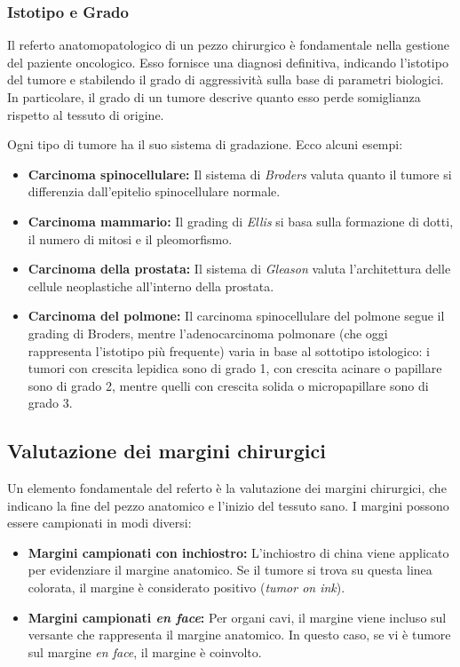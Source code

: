 \subsubsection{Istotipo e Grado}
Il referto anatomopatologico di un pezzo chirurgico è fondamentale nella gestione del paziente oncologico. Esso fornisce una diagnosi definitiva, indicando l’istotipo del tumore e stabilendo il grado di aggressività sulla base di parametri biologici. In particolare, il grado di un tumore descrive quanto esso perde somiglianza rispetto al tessuto di origine.

Ogni tipo di tumore ha il suo sistema di gradazione. Ecco alcuni esempi:
\begin{itemize}
    \item \textbf{Carcinoma spinocellulare:} Il sistema di \textit{Broders} valuta quanto il tumore si differenzia dall'epitelio spinocellulare normale.
    \item \textbf{Carcinoma mammario:} Il grading di \textit{Ellis} si basa sulla formazione di dotti, il numero di mitosi e il pleomorfismo.
    \item \textbf{Carcinoma della prostata:} Il sistema di \textit{Gleason} valuta l'architettura delle cellule neoplastiche all'interno della prostata.
    \item \textbf{Carcinoma del polmone:} Il carcinoma spinocellulare del polmone segue il grading di Broders, mentre  l'adenocarcinoma polmonare (che oggi rappresenta l'istotipo più frequente) varia in base al sottotipo istologico: i tumori con crescita lepidica sono di grado 1, con crescita acinare o papillare sono di grado 2, mentre quelli con crescita solida o micropapillare sono di grado 3.
\end{itemize}

\subsection{Valutazione dei margini chirurgici}
Un elemento fondamentale del referto è la valutazione dei margini chirurgici, che indicano la fine del pezzo anatomico e l'inizio del tessuto sano. I margini possono essere campionati in modi diversi:
\begin{itemize}
    \item \textbf{Margini campionati con inchiostro:} L'inchiostro di china viene applicato per evidenziare il margine anatomico. Se il tumore si trova su questa linea colorata, il margine è considerato positivo (\textit{tumor on ink}).
    \item \textbf{Margini campionati \textit{en face}:} Per organi cavi, il margine viene incluso sul versante che rappresenta il margine anatomico. In questo caso, se vi è tumore sul margine \textit{en face}, il margine è coinvolto.
\end{itemize}

